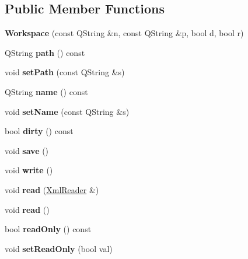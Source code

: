 \subsection*{Public Member Functions}
\begin{DoxyCompactItemize}
\item 
\mbox{\label{class_ms_1_1_workspace_a2c3c45ca0ab291569c1a8e3cc1d339b4}} 
{\bfseries Workspace} (const Q\+String \&n, const Q\+String \&p, bool d, bool r)
\item 
\mbox{\label{class_ms_1_1_workspace_a459405a351e4d686903a791e63d2c45b}} 
Q\+String {\bfseries path} () const
\item 
\mbox{\label{class_ms_1_1_workspace_ae0a415a2f643283bd664026700474fe8}} 
void {\bfseries set\+Path} (const Q\+String \&s)
\item 
\mbox{\label{class_ms_1_1_workspace_a74db7fb48dd6656eb5f097a0ddfca43e}} 
Q\+String {\bfseries name} () const
\item 
\mbox{\label{class_ms_1_1_workspace_a78f867a792b894ecfc1ee8d8cbe40a74}} 
void {\bfseries set\+Name} (const Q\+String \&s)
\item 
\mbox{\label{class_ms_1_1_workspace_a6a59e33780b639f61faf78ed410aa4bf}} 
bool {\bfseries dirty} () const
\item 
\mbox{\label{class_ms_1_1_workspace_a6ecba845846dbaf7202824a0d2791d28}} 
void {\bfseries save} ()
\item 
\mbox{\label{class_ms_1_1_workspace_a2c3e833d839faaa27e5122d1c2c6a4a4}} 
void {\bfseries write} ()
\item 
\mbox{\label{class_ms_1_1_workspace_a872756fdde3915f3a8faea2114a30322}} 
void {\bfseries read} (\hyperlink{class_ms_1_1_xml_reader}{Xml\+Reader} \&)
\item 
\mbox{\label{class_ms_1_1_workspace_a40ff387e3fe659bc01f6c761c841a60e}} 
void {\bfseries read} ()
\item 
\mbox{\label{class_ms_1_1_workspace_af033716f87176dca203b22008e31d4ae}} 
bool {\bfseries read\+Only} () const
\item 
\mbox{\label{class_ms_1_1_workspace_ad1f887c89e54c942ec6e713e75012b5d}} 
void {\bfseries set\+Read\+Only} (bool val)
\end{DoxyCompactItemize}
